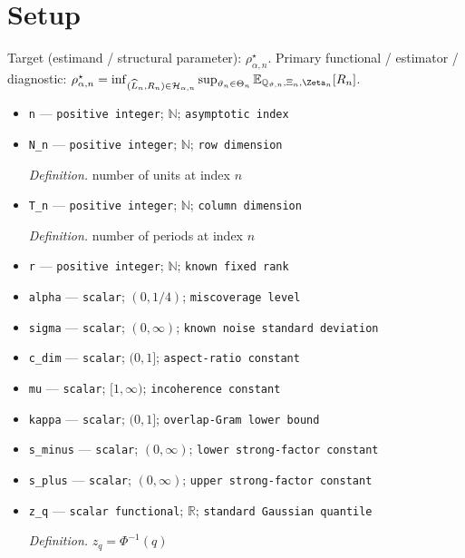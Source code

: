 \documentclass{article}
\begin{document}
\section{Setup}

Target (estimand / structural parameter): \(\rho_{\alpha,n}^{\star}\).
Primary functional / estimator / diagnostic: \(\rho_{\alpha,n}^{\star}=\inf_{(\widehat L_n,R_n)\in\mathcal H_{\alpha,n}}\sup_{\vartheta_n\in\Theta_n}\mathbb E_{\mathbb Q_{\vartheta,n},\Xi_n,\Zeta_n}[R_n]\).
\begin{itemize}
  \item \texttt{n} --- \texttt{positive integer}; \(\mathbb N\); \texttt{asymptotic index}
  \item \texttt{N\_\allowbreak{}n} --- \texttt{positive integer}; \(\mathbb N\); \texttt{row dimension}
  \par\smallskip\noindent\emph{Definition.} number of units at index \(n\)
  \item \texttt{T\_\allowbreak{}n} --- \texttt{positive integer}; \(\mathbb N\); \texttt{column dimension}
  \par\smallskip\noindent\emph{Definition.} number of periods at index \(n\)
  \item \texttt{r} --- \texttt{positive integer}; \(\mathbb N\); \texttt{known fixed rank}
  \item \texttt{alpha} --- \texttt{scalar}; \((0,1/4)\); \texttt{miscoverage level}
  \item \texttt{sigma} --- \texttt{scalar}; \((0,\infty)\); \texttt{known noise standard deviation}
  \item \texttt{c\_\allowbreak{}dim} --- \texttt{scalar}; \((0,1]\); \texttt{aspect-\allowbreak{}ratio constant}
  \item \texttt{mu} --- \texttt{scalar}; \([1,\infty)\); \texttt{incoherence constant}
  \item \texttt{kappa} --- \texttt{scalar}; \((0,1]\); \texttt{overlap-\allowbreak{}Gram lower bound}
  \item \texttt{s\_\allowbreak{}minus} --- \texttt{scalar}; \((0,\infty)\); \texttt{lower strong-\allowbreak{}factor constant}
  \item \texttt{s\_\allowbreak{}plus} --- \texttt{scalar}; \((0,\infty)\); \texttt{upper strong-\allowbreak{}factor constant}
  \item \texttt{z\_\allowbreak{}q} --- \texttt{scalar functional}; \(\mathbb R\); \texttt{standard Gaussian quantile}
  \par\smallskip\noindent\emph{Definition.} \(z_q=\Phi^{-1}(q)\)

\end{itemize}
\end{document}
